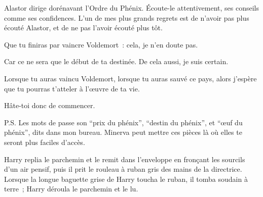 \begin{writtenNote}
Alastor dirige dorénavant l'Ordre du Phénix.
Écoute-le attentivement, ses conseils comme ses confidences.
L'un de mes plus grands regrets est de n'avoir pas plus écouté Alastor, et de ne pas l'avoir écouté plus tôt.

Que tu finiras par vaincre Voldemort~: cela, je n'en doute pas.

Car ce ne sera que le début de ta destinée.
De cela aussi, je suis certain.

Lorsque tu auras vaincu Voldemort, lorsque tu auras sauvé ce pays, alors j'espère que tu pourras t'atteler à l'œuvre de ta vie.

Hâte-toi donc de commencer.


P.S. Les mots de passe son “prix du phénix”, “destin du phénix”, et “œuf du phénix”, dits dans mon bureau.
Minerva peut mettre ces pièces là où elles te seront plus faciles d'accès.
\end{writtenNote}

\later

Harry replia le parchemin et le remit dans l'enveloppe en fronçant les sourcils d'un air pensif, puis il prit le rouleau à ruban gris des mains de la directrice.
Lorsque la longue baguette grise de Harry toucha le ruban, il tomba soudain à terre~; Harry déroula le parchemin et le lu.

